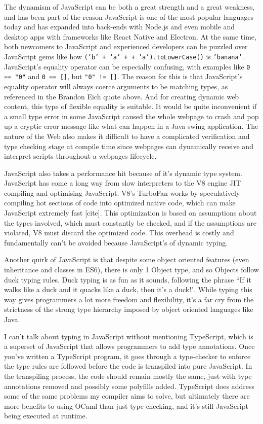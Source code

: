 \documentclass[12pt,a4paper,twoside,openright]{report}
\begin{document}
The dynamism of JavaScript can be both a great strength and a great weakness, and has been part of the reason JavaScript is one of the most popular languages today and has expanded into back-ends with Node.js and even mobile and desktop apps with frameworks like React Native and Electron.
At the same time, both newcomers to JavaScript and experienced developers can be puzzled over JavaScript gems like how \mbox{\tt ('b' + 'a' + + 'a').toLowerCase()} is {\tt 'banana'}.
JavaScript's equality operator can be especially confusing, with examples like {\tt 0 == "0"} and {\tt 0 == []}, but {\tt "0" != []}.
The reason for this is that JavaScript's equality operator will always coerce arguments to be matching types, as referenced in the Brandon Eich quote above.
And for creating dynamic web content, this type of flexible equality is suitable.
It would be quite inconvenient if a small type error in some JavaScript caused the whole webpage to crash and pop up a cryptic error message like what can happen in a Java swing application.
The nature of the Web also makes it difficult to have a complicated verification and type checking stage at compile time since webpages can dynamically receive and interpret scripts throughout a webpages lifecycle.

JavaScript also takes a performance hit because of it's dynamic type system.
JavaScript has come a long way from slow interpreters to the V8 engine JIT compiling and optimising JavaScript.
V8's TurboFan works by speculatively compiling hot sections of code into optimized native code, which can make JavaScript extremely fast [cite].
This optimization is based on assumptions about the types involved, which must constantly be checked, and if the assumptions are violated, V8 must discard the optimized code.
This overhead is costly and fundamentally can't be avoided because JavaScript's of dynamic typing.

Another quirk of JavaScript is that despite some object oriented features (even inheritance and classes in ES6), there is only 1 Object type, and so Objects follow duck typing rules.
Duck typing is as fun as it sounds, following the phrase ``If it walks like a duck and it quacks like a duck, then it's a duck!".
While typing this way gives programmers a lot more freedom and flexibility, it's a far cry from the strictness of the strong type hierarchy imposed by object oriented languages like Java.

I can't talk about typing in JavaScript without mentioning TypeScript, which is a superset of JavaScript that allows programmers to add type annotations.
Once you've written a TypeScript program, it goes through a type-checker to enforce the type rules are followed before the code is transpiled into pure JavaScript.
In the transpiling process, the code should remain mostly the same, just with type annotations removed and possibly some polyfills added.
TypeScript does address some of the same problems my compiler aims to solve, but ultimately there are more benefits to using OCaml than just type checking, and it's still JavaScript being executed at runtime.
\end{document}
